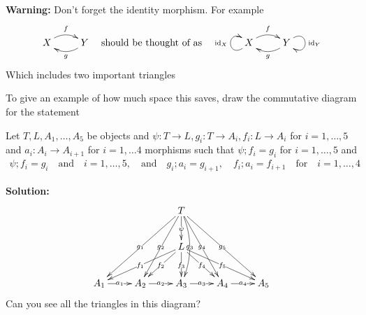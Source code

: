 \textbf{Warning:} Don't forget the identity morphism. For example
\begin{align*}
  \xymatrix{
    X
    \ar@/^2ex/[r]^{f}
    &
    Y
    \ar@/^2ex/[l]^{g}
  }
\quad \text{should be thought of as} \quad
  \xymatrix{
    X
    \ar@(dl,ul)[]^{\id_X}
    \ar@/^2ex/[r]^{f}
    &
    Y
    \ar@/^2ex/[l]^{g}
    \ar@(ur,dr)[]^{\id_Y}
  }
\end{align*}
Which includes two important triangles
\begin{center}
\quad {} \quad 
{}
\end{center}




To give an example of how much space this saves, draw the commutative diagram for the statement
\begin{center}
  Let $T,L,A_1,\ldots,A_5$ be objects and $\psi: T \to L, g_i: T \to A_i, f_i: L \to A_i$ for $i = 1,\ldots,5$ and $a_i: A_i \to A_{i+1}$ for $i = 1,\ldots 4$ 
  morphisms such that 
  $\psi;f_i = g_i$ for $i = 1,\ldots, 5$ and 
  \begin{align}
  \psi;f_i = g_i \quad \text{and} \quad 
  i = 1,\ldots, 5,
  \quad \text{and} \quad 
  g_i;a_i = g_{i+1}
  ,\quad
  f_i;a_i = f_{i+1}
  \quad \text{for} \quad 
  i = 1,\ldots, 4
  \label{eq:conditions}
  \end{align}
\end{center}

\textbf{Solution:}
\begin{align*}
  \xymatrix{
    &&
    T
    \ar[d]|{\psi}
    \ar[ddll]|{g_1}
    \ar[ddl]|{g_2}
    \ar@/^2ex/[dd]|{g_3}
    \ar[ddr]|{g_4}
    \ar[ddrr]|{g_5}
    \\
    &&
    L
    \ar[dll]|{f_1}
    \ar[dl]|{f_2}
    \ar[d]|{f_3}
    \ar[dr]|{f_4}
    \ar[drr]|{f_5}
    \\
    A_1
    \ar[r]|{a_1}
    &
    A_2
    \ar[r]|{a_2}
    &
    A_3
    \ar[r]|{a_3}
    &
    A_4
    \ar[r]|{a_4}
    &
    A_5
  }
\end{align*}
Can you see all the triangles in this diagram?

